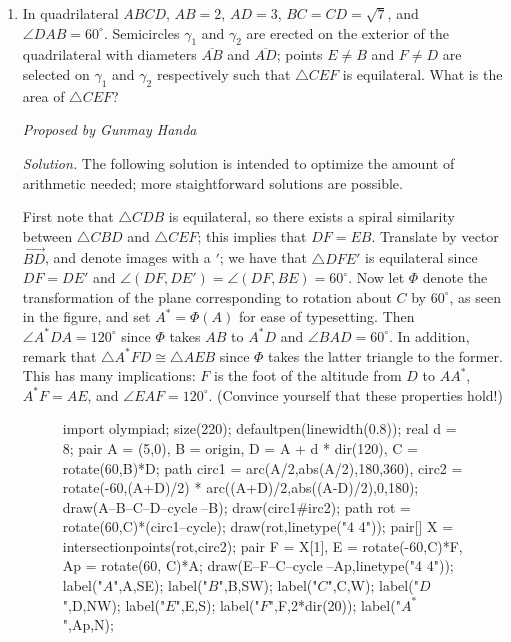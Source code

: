 \documentclass[10pt]{article}
\newcommand{\proposed}[1]
{
\vspace{5pt}
\noindent\textit{Proposed by #1}
}
\newcommand{\solution}
{
\vspace{5pt}
\noindent\textit{Solution.}\qquad
}
\begin{document}
\begin{enumerate}
\item In quadrilateral $ABCD$, $AB=2$, $AD=3$, $BC=CD=\sqrt7$, and $\angle DAB=60^\circ$. Semicircles $\gamma_1$ and $\gamma_2$ are erected on the exterior of the quadrilateral with diameters $\overline{AB}$ and $\overline{AD}$; points $E\neq B$ and $F\neq D$ are selected on $\gamma_1$ and $\gamma_2$ respectively such that $\triangle CEF$ is equilateral. What is the area of $\triangle CEF$?

\proposed{Gunmay Handa}

\solution The following solution is intended to optimize the amount of arithmetic needed; more staightforward solutions are possible.

\par First note that $\triangle CDB$ is equilateral, so there exists a spiral similarity between $\triangle CBD$ and $\triangle CEF$; this implies that $DF=EB$. Translate by vector $\vec{BD}$, and denote images with a $'$; we have that $\triangle DFE'$ is equilateral since $DF=DE'$ and $\angle(DF, DE')=\angle(DF,BE)=60^\circ$. Now let $\Phi$ denote the transformation of the plane corresponding to rotation about $C$ by $60^\circ$, as seen in the figure, and set $A^* = \Phi(A)$ for ease of typesetting.  Then $\angle A^*DA = 120^\circ$ since $\Phi$ takes $AB$ to $A^*D$ and $\angle BAD = 60^\circ$. In addition, remark that $\triangle A^*FD\cong\triangle AEB$ since $\Phi$ takes the latter triangle to the former.  This has many implications: $F$ is the foot of the altitude from $D$ to $AA^*$, $A^*F = AE$, and $\angle EAF = 120^\circ$.  (Convince yourself that these properties hold!)

\begin{figure}[ht]
	\centering
	\begin{asy}
	import olympiad;
	size(220);
defaultpen(linewidth(0.8));
real d = 8;
pair A = (5,0), B = origin, D = A + d * dir(120), C = rotate(60,B)*D;
path circ1 = arc(A/2,abs(A/2),180,360), circ2 = rotate(-60,(A+D)/2) * arc((A+D)/2,abs((A-D)/2),0,180);
draw(A--B--C--D--cycle^^D--B);
draw(circ1^^circ2);
path rot = rotate(60,C)*(circ1--cycle);
draw(rot,linetype("4 4"));
pair[] X = intersectionpoints(rot,circ2);
pair F = X[1], E = rotate(-60,C)*F, Ap = rotate(60, C)*A;
draw(E--F--C--cycle^^A--Ap,linetype("4 4"));
label("$A$",A,SE);
label("$B$",B,SW);
label("$C$",C,W);
label("$D$",D,NW);
label("$E$",E,S);
label("$F$",F,2*dir(20));
label("$A^*$",Ap,N);
\end{asy}
\end{figure}


\end{enumerate}
\end{document}
